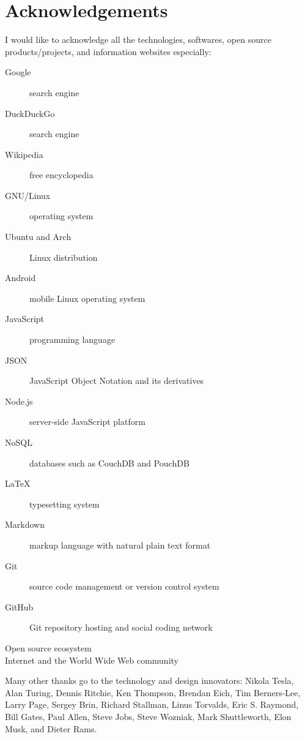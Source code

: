 
\begingroup
\let\clearpage\relax
\let\cleardoublepage\relax

\chapter{Acknowledgements}
\label{chap:acknowledgements}

I would like to acknowledge all the technologies, softwares, open source products/projects, and information websites especially:

\begin{description}
  \item[Google] search engine
  \item[DuckDuckGo] search engine
  \item[Wikipedia] free encyclopedia
  \item[GNU/Linux] operating system
  \item[Ubuntu and Arch] Linux distribution
  \item[Android] mobile Linux operating system
  \item[JavaScript] programming language
  \item[JSON] JavaScript Object Notation and its derivatives
  \item[Node.js] server-side JavaScript platform
  \item[NoSQL] databases such as CouchDB and PouchDB
  \item[LaTeX] typesetting system
  \item[Markdown] markup language with natural plain text format
  \item[Git] source code management or version control system
  \item[GitHub] Git repository hosting and social coding network
  \item[Open source ecosystem]
  \item[Internet and the World Wide Web community]
\end{description}

\noindent Many other thanks go to the technology and design innovators: Nikola Tesla, Alan Turing, Dennis Ritchie, Ken Thompson, Brendan Eich, Tim Berners-Lee, Larry Page, Sergey Brin, Richard Stallman, Linus Torvalds, Eric S. Raymond, Bill Gates, Paul Allen, Steve Jobs, Steve Wozniak, Mark Shuttleworth, Elon Musk, and Dieter Rams.

\endgroup
